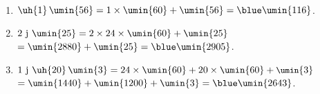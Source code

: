    \ \\ [-5mm]
   \begin{enumerate}
      \item $\uh{1}\,\umin{56} =1\times\umin{60}+\umin{56} =\blue \umin{116}$.
      \item $2\text{ j } \umin{25} =2\times24\times\umin{60}+\umin{25}$ \\
         \quad $=\umin{2880}+\umin{25} =\blue \umin{2905}$.
      \item $1\text{ j } \uh{20}\,\umin{3} =24\times\umin{60}+20\times\umin{60}+\small\umin{3}$ \\
         \quad $=\umin{1440}+\umin{1200}+\umin{3} =\blue \umin{2643}$.
   \end{enumerate}
